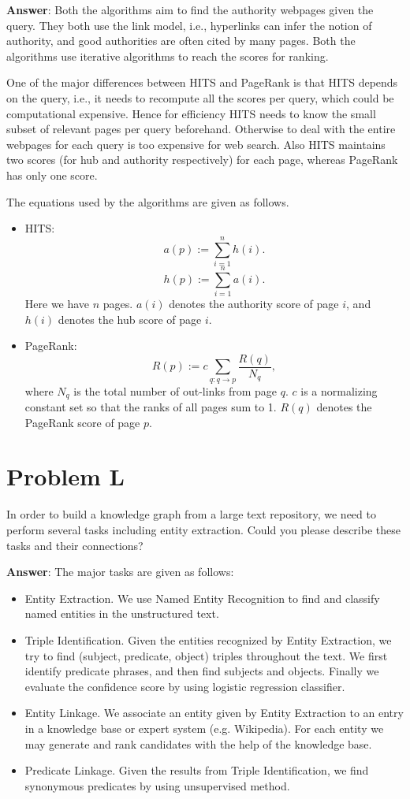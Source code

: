 \documentclass{article}
\begin{document}
{\bf Answer}:
Both the algorithms aim to find the authority webpages given the query. They both use the link model, i.e., hyperlinks can infer the notion of authority, and good authorities are often cited by many pages. Both the algorithms use iterative algorithms to reach the scores for ranking.

One of the major differences between HITS and PageRank is that HITS depends on the query, i.e., it needs to recompute all the scores per query, which could be computational expensive. Hence for efficiency HITS needs to know the small subset of relevant pages per query beforehand. Otherwise to deal with the entire webpages for each query is too expensive for web search. Also HITS maintains two scores (for hub and authority respectively) for each page, whereas PageRank has only one score. 

The equations used by the algorithms are given as follows.
\begin{itemize}
\item HITS:
$$a(p) := \sum_{i=1}^n h(i).$$
$$h(p) := \sum_{i=1}^n a(i).$$
Here we have $n$ pages. $a(i)$ denotes the authority score of page $i$, and $h(i)$ denotes the hub score of page $i$.

\item PageRank:
$$R(p) := c \sum_{q: q \to p} \frac{R(q)}{N_q},$$
where $N_q$ is the total number of out-links from page $q$. $c$ is a normalizing constant set so that the ranks of all pages sum to 1. $R(q)$ denotes the PageRank score of page $p$.
\end{itemize}

\section{Problem L}
In order to build a knowledge graph from a large text repository, we need to perform several tasks including entity extraction. Could you please describe these tasks and their connections?

{\bf Answer}:
The major tasks are given as follows:
\begin{itemize}
\item Entity Extraction. We use Named Entity Recognition to find and classify named entities in the unstructured text.
\item Triple Identification. Given the entities recognized by Entity Extraction, we try to find (subject, predicate, object) triples throughout the text. We first identify predicate phrases, and then find subjects and objects. Finally we evaluate the confidence score by using logistic regression classifier.
\item Entity Linkage. We associate an entity given by Entity Extraction to an entry in a knowledge base or expert system (e.g. Wikipedia). For each entity we may generate and rank candidates with the help of the knowledge base.
\item Predicate Linkage. Given the results from Triple Identification, we find synonymous predicates by using unsupervised method.
\end{itemize}
\end{document}
